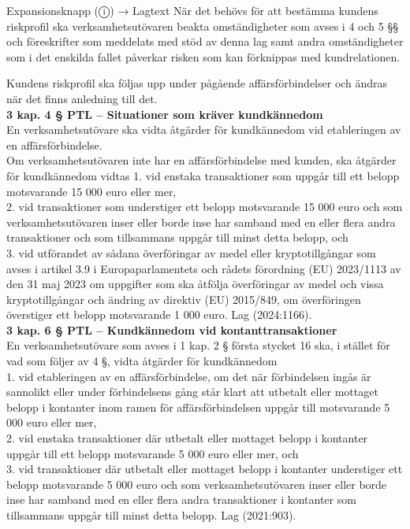 \documentclass[10pt]{beamer}
\begin{document}
\begin{frame}[label=riskfragor-steg3]
\begin{alertblock}{Expansionsknapp (ⓘ) → Lagtext}
    När det behövs för att bestämma kundens riskprofil ska verksamhetsutövaren beakta omständigheter 
    som avses i 4 och 5 §§ och föreskrifter som meddelats med stöd av denna lag samt andra omständigheter 
    som i det enskilda fallet påverkar risken som kan förknippas med kundrelationen.

    Kundens riskprofil ska följas upp under pågående affärsförbindelser och ändras när det finns 
    anledning till det.\\[0.1cm]

    \tiny \textbf{3 kap. 4 § PTL – Situationer som kräver kundkännedom}\\
    \tiny En verksamhetsutövare ska vidta åtgärder för kundkännedom vid etableringen av en affärsförbindelse.\\

    Om verksamhetsutövaren inte har en affärsförbindelse med kunden, ska åtgärder för kundkännedom vidtas
    1. vid enstaka transaktioner som uppgår till ett belopp motsvarande 15 000 euro eller mer,\\
    2. vid transaktioner som understiger ett belopp motsvarande 15 000 euro och som verksamhetsutövaren 
    inser eller borde inse har samband med en eller flera andra transaktioner och som tillsammans uppgår 
    till minst detta belopp, och\\
    3. vid utförandet av sådana överföringar av medel eller kryptotillgångar som avses i artikel 3.9 i 
    Europaparlamentets och rådets förordning (EU) 2023/1113 av den 31 maj 2023 om uppgifter som 
    ska åtfölja överföringar av medel och vissa kryptotillgångar och ändring av direktiv (EU) 2015/849, 
    om överföringen överstiger ett belopp motsvarande 1 000 euro.
    Lag (2024:1166).\\[0.1cm]

    \tiny \textbf{3 kap. 6 § PTL – Kundkännedom vid kontanttransaktioner}\\
    \tiny En verksamhetsutövare som avses i 1 kap. 2 § första stycket 16 ska, i stället för vad som 
    följer av 4 §, vidta åtgärder för kundkännedom\\
    1. vid etableringen av en affärsförbindelse, om det när förbindelsen ingås är sannolikt eller under 
    förbindelsens gång står klart att utbetalt eller mottaget belopp i kontanter inom ramen för 
    affärsförbindelsen uppgår till motsvarande 5 000 euro eller mer,\\
    2. vid enstaka transaktioner där utbetalt eller mottaget belopp i kontanter uppgår till ett 
    belopp motsvarande 5 000 euro eller mer, och\\
    3. vid transaktioner där utbetalt eller mottaget belopp i kontanter understiger ett belopp 
    motsvarande 5 000 euro och som verksamhetsutövaren inser eller borde inse har samband med en 
    eller flera andra transaktioner i kontanter som tillsammans uppgår till minst detta belopp. Lag (2021:903).\\[0.1cm]


\end{alertblock}
\end{frame}
\end{document}

